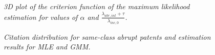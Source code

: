 \documentclass[letterpaper,12pt]{article}
\theoremstyle{definition}
\begin{document}
\begin{figure}[htb]\centering \captionsetup{width=5.8in}
    \caption{\label{fig:Crit}\textit{3D plot of the criterion function of the maximum likelihood estimation for values of $\alpha$ and $\frac{\lambda_{abr, int} + \tau}{\lambda_{inc,0}}$.}}
\end{figure}

\begin{figure}[htb]\centering \captionsetup{width=5.8in}
    \caption{\label{fig:GMM_MLE}\textit{Citation distribution for same-class abrupt patents and estimation results for MLE and GMM.}}
\end{figure}
\end{document}
